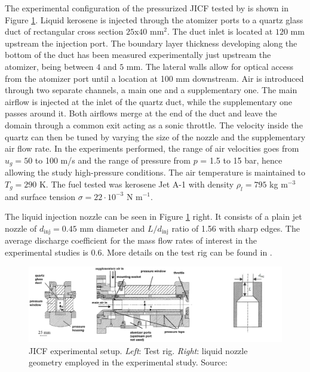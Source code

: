 The experimental configuration of the pressurized JICF tested by  is shown in Figure \ref{fig:experiment_JICF_DLR}. Liquid kerosene is injected through the atomizer ports to a quartz glass duct of rectangular cross section $25$x$40$ mm$^2$. The duct inlet is located at $120$ mm upstream the injection port. The boundary layer thickness developing along the bottom of the duct has been measured experimentally just upstream the atomizer, being between $4$ and $5$ mm. The lateral walls allow for optical access from the atomizer port until a location at 100 mm downstream. Air is introduced through two separate channels, a main one and a supplementary one. The main airflow is injected at the inlet of the quartz duct, while the supplementary one passes around it. Both airflows merge at the end of the duct and leave the domain through a common exit acting as a sonic throttle. The velocity inside the quartz can then be tuned by varying the size of the nozzle and the supplementary air flow rate. In the experiments performed, the range of air velocities goes from $u_g = 50$ to 100 m/s and the range of pressure from $p$ = 1.5 to 15 bar, hence allowing the study high-pressure conditions. The air temperature is maintained to $T_g = 290$ K. The fuel tested was kerosene Jet A-1 with density $\rho_l = 795$ kg m$^{-3}$ and surface tension $\sigma = 22 \cdot 10^{-3}$ N m$^{-1}$.

The liquid injection nozzle can be seen in Figure \ref{fig:experiment_JICF_DLR} right. It consists of a plain jet nozzle of $d_\mathrm{inj} =  0.45$ mm diameter and $L/d_\mathrm{inj}$ ratio of 1.56 with sharp edges. The average discharge coefficient for the mass flow rates of interest in the experimental studies is $0.6$. More details on the test rig can be found in .

\clearpage

\begin{figure}[h!]
	\centering
	\includegraphics[scale=0.35]{./part2_developments/figures_ch5_resolved_JICF/experiment_JICF_DLR}
	\caption[JICF experimental setup]{JICF experimental setup. \textsl{Left}: Test rig. \textsl{Right}: liquid nozzle geometry employed in the experimental study. Source: }
	\label{fig:experiment_JICF_DLR}
\end{figure}




